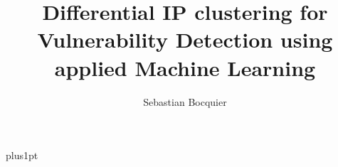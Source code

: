 \documentclass[12pt]{dissertation}
\title{Differential IP clustering for Vulnerability Detection using applied Machine Learning}
\author{Sebastian Bocquier}             %
\begin{document}
\baselineskip=18pt plus1pt

\setcounter{secnumdepth}{3}
\setcounter{tocdepth}{3}


\maketitle                  %

\begin{romanpages}          %
\tableofcontents            %
\listoffigures              %
\end{romanpages}            %


%
%
%
%
%

\appendix



\end{document}
